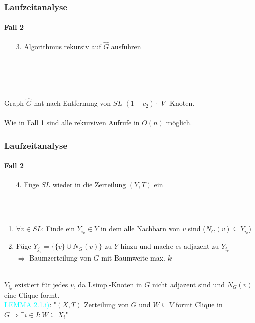 \begin{frame}
\frametitle{Laufzeitanalyse}
\framesubtitle{Fall 2}

\begin{enumerate}
	\item[3.] Algorithmus rekursiv auf $\widehat{G}$ ausführen
\end{enumerate}
\ \\
\ \\
\ \\
\ \\
Graph $\widehat{G}$ hat nach Entfernung von $SL$ $(1 - c_2) \cdot |V|$ Knoten. \\
\ \\
Wie in Fall 1 sind alle rekursiven Aufrufe in $O(n)$ möglich. \\

\end{frame}


\begin{frame}
\frametitle{Laufzeitanalyse}
\framesubtitle{Fall 2}

\begin{enumerate}
	\item[4.] Füge $SL$ wieder in die Zerteilung $(Y,T)$ ein
\end{enumerate}
\ \\
\ \\
\begin{enumerate}
	\item $\forall v \in SL$: Finde ein $Y_{i_v} \in Y$ in dem alle Nachbarn von $v$ sind ($N_G(v) \subseteq Y_{i_v}$)
	\item Füge $Y_{j_v} = \{ \{v\} \cup N_G(v) \}$ zu $Y$ hinzu und mache es adjazent zu $Y_{i_v}$ \\
	$\Rightarrow$ Baumzerteilung von $G$ mit Baumweite max. $k$
\end{enumerate}
\ \\
$Y_{i_v}$ existiert für jedes $v$, da I.simp.-Knoten in $G$ nicht adjazent sind und $N_G(v)$ eine Clique formt. \\
\textcolor{cyan}{LEMMA 2.1.i)}: "$(X,T)$ Zerteilung von $G$ und $W \subseteq V$ formt Clique in $G \Rightarrow \exists i \in I: W \subseteq X_i$"
\end{frame}

